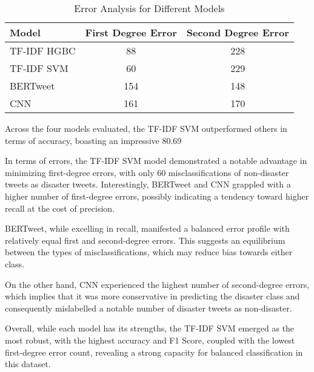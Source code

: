 \documentclass[10pt,table]{article}
\begin{document}
\begin{table}[h]
    \centering
    \begin{tabular}{lcc}
    \hline
    \textbf{Model}      & \textbf{First Degree Error} & \textbf{Second Degree Error} \\ \hline
    TF-IDF HGBC    & 88                          & 228                         \\
    TF-IDF SVM     & 60                          & 229                         \\
    BERTweet       & 154                         & 148                         \\
    CNN            & 161                         & 170                         \\ \hline
    \end{tabular}
    \caption{Error Analysis for Different Models}
\end{table}

Across the four models evaluated, the TF-IDF SVM outperformed others in terms of accuracy, boasting an impressive 80.69%

In terms of errors, the TF-IDF SVM model demonstrated a notable advantage in minimizing first-degree errors, with only 60 misclassifications of non-disaster tweets as disaster tweets. Interestingly, BERTweet and CNN grappled with a higher number of first-degree errors, possibly indicating a tendency toward higher recall at the cost of precision.

BERTweet, while excelling in recall, manifested a balanced error profile with relatively equal first and second-degree errors. This suggests an equilibrium between the types of misclassifications, which may reduce bias towards either class.

On the other hand, CNN experienced the highest number of second-degree errors, which implies that it was more conservative in predicting the disaster class and consequently mislabelled a notable number of disaster tweets as non-disaster.

Overall, while each model has its strengths, the TF-IDF SVM emerged as the most robust, with the highest accuracy and F1 Score, coupled with the lowest first-degree error count, revealing a strong capacity for balanced classification in this dataset.
\end{document}
